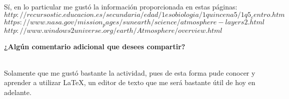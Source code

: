 \documentclass{article}
\begin{document}
\begin{itemize}
\\ Sí, en lo particular me gustó la información proporcionada en estas páginas:	
\\
$http://recursostic.educacion.es/secundaria/edad/1esobiologia/1quincena5/1q5_centro.htm$
\\
$https://www.nasa.gov/mission_pages/sunearth/science/atmosphere-layers2.html$
\\
$http://www.windows2universe.org/earth/Atmosphere/overview.html$
{\item \bfseries ¿Algún comentario adicional que desees compartir?}
\\
Solamente que me gustó bastante la actividad, pues de esta forma pude conocer y aprender a utilizar LaTeX, un editor de texto que me será bastante útil de hoy en adelante.
\end{itemize}
\end{document}
